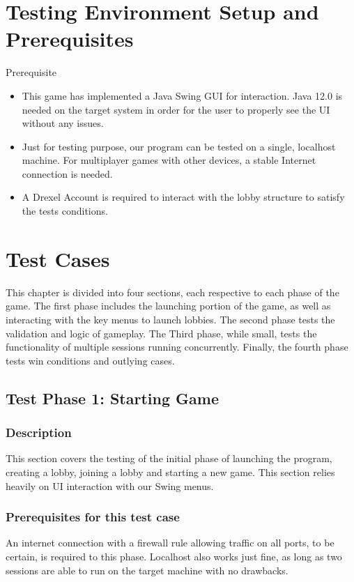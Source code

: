 \documentclass{scrreprt}
\begin{document}
\chapter{Testing Environment Setup and Prerequisites}

Prerequisite
\begin{itemize}
  \item This game has implemented a Java Swing GUI for interaction. Java 12.0 is needed on the target system in order for the user to properly see the UI without any issues.
  \item Just for testing purpose, our program can be tested on a single, localhost machine. For multiplayer games with other devices, a stable Internet connection is needed.
  \item A Drexel Account is required to interact with the lobby structure to satisfy the tests conditions.
\end{itemize}

\chapter{Test Cases}

This chapter is divided into four sections, each respective to each phase of the game. The first phase includes the launching portion of the game, as well as interacting with the key menus to launch lobbies. The second phase tests the validation and logic of gameplay. The Third phase, while small, tests the functionality of multiple sessions running concurrently. Finally, the fourth phase tests win conditions and outlying cases.

\section{Test Phase 1: Starting Game}

\subsection{Description}
This section covers the testing of the initial phase of launching the program, creating a lobby, joining a lobby and starting a new game. This section relies heavily on UI interaction with our Swing menus.
\subsection{Prerequisites for this test case} An internet connection with a firewall rule allowing traffic on all ports, to be certain, is required to this phase. Localhost also works just fine, as long as two sessions are able to run on the target machine with no drawbacks.
\end{document}
